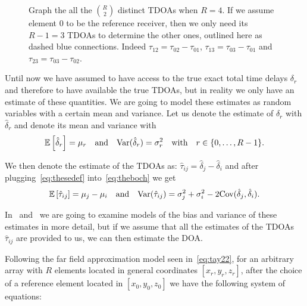 \begin{figure}[htb]
\centering
{}
\caption[]{Graph the all the \(\binom{R}{2}\) distinct TDOAs when \(R=4\). If we assume element \(0\) to be the reference receiver, then we only need its \(R-1=3\) TDOAs to determine the other ones, outlined here as dashed blue connections. Indeed \(\tau_{12}=\tau_{02}-\tau_{01}\),  \(\tau_{13}=\tau_{03}-\tau_{01}\) and  \(\tau_{23}=\tau_{03}-\tau_{02}\).}
\label{fig:referee}
\end{figure}

\noindent
Until now we have assumed to have access to the true exact total time delays \(\delta_r\) and therefore to have available the true TDOAs, but in reality we only have an estimate of these quantities. We are going to model these estimates as random variables with a certain mean and variance. Let us denote the estimate of \(\delta_r\) with \(\hat{\delta}_r\) and denote its mean and variance with
\begin{equation}
\mathbb{E}\left[{\hat{\delta}_r}\right]=\mu_{r} \quad \text{and} \quad \text{Var}(\hat{\delta}_r)=\sigma_r^2
\quad
\text{with}
\quad r \in\{0,\ldots,R-1\}.
\label{eq:thesedef}
\end{equation}

\noindent
We then denote the estimate of the TDOAs as: \(\hat{\tau}_{ij}=\hat{\delta}_j-\hat{\delta}_i\) and after plugging~\eqref{eq:thesedef} into~\eqref{eq:theboch} we get
\begin{align}
\mathbb{E}\left[{\hat{\tau}_{ij}}\right]=\mu_{j}-\mu_{i} \quad \text{and} \quad \text{Var}(\hat{\tau}_{ij})=\sigma_j^2+\sigma_i^2-2\text{Cov}(\hat{\delta}_j,\hat{\delta}_i).
\label{eq:modelofestimate}
\end{align} 

\noindent
In~ and~ we are going to examine models of the bias and variance of these estimates in more detail, but if we assume that all the estimates of the TDOAs \(\hat{\tau}_{ij}\) are provided to us, we can then estimate the DOA.

\noindent
Following the far field approximation model seen in~\eqref{eq:tay22}, for an arbitrary array with \(R\) elements located in general coordinates \([x_{r},y_{r},z_{r}]\), after the choice of a reference element located in \([x_{0},y_{0},z_{0}]\) we have the following system of equations:

